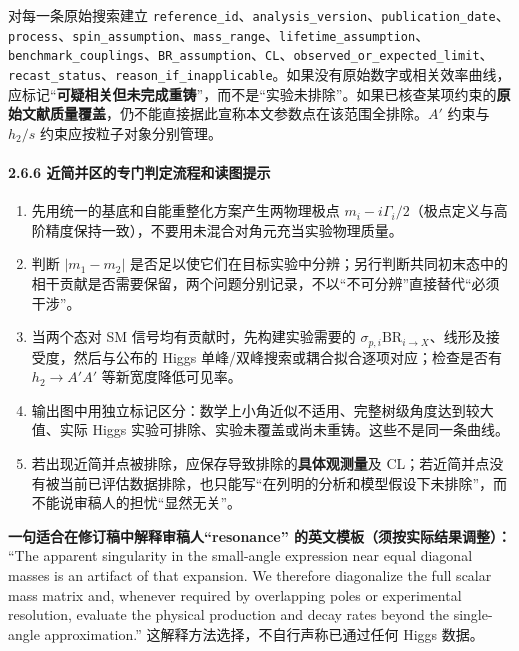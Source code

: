 \documentclass[
]{article}
\providecommand{\tightlist}{%
  \setlength{\itemsep}{0pt}\setlength{\parskip}{0pt}}
\begin{document}
对每一条原始搜索建立
\texttt{reference\_id}、\texttt{analysis\_version}、\texttt{publication\_date}、\texttt{process}、\texttt{spin\_assumption}、\texttt{mass\_range}、\texttt{lifetime\_assumption}、\texttt{benchmark\_couplings}、\texttt{BR\_assumption}、\texttt{CL}、\texttt{observed\_or\_expected\_limit}、\texttt{recast\_status}、\texttt{reason\_if\_inapplicable}。如果没有原始数字或相关效率曲线，应标记``\textbf{可疑相关但未完成重铸}''，而不是``实验未排除''。如果已核查某项约束的\textbf{原始文献质量覆盖}，仍不能直接据此宣称本文参数点在该范围全排除。\(A'\)
约束与 \(h_2/s\) 约束应按粒子对象分别管理。

\paragraph{2.6.6
近简并区的专门判定流程和读图提示}\label{ux8fd1ux7b80ux5e76ux533aux7684ux4e13ux95e8ux5224ux5b9aux6d41ux7a0bux548cux8bfbux56feux63d0ux793a}

\begin{enumerate}
\def\labelenumi{\arabic{enumi}.}
\tightlist
\item
  先用统一的基底和自能重整化方案产生两物理极点
  \(m_i-i\Gamma_i/2\)（极点定义与高阶精度保持一致），不要用未混合对角元充当实验物理质量。
\item
  判断 \(|m_1-m_2|\)
  是否足以使它们在目标实验中分辨；另行判断共同初末态中的相干贡献是否需要保留，两个问题分别记录，不以``不可分辨''直接替代``必须干涉''。
\item
  当两个态对 SM 信号均有贡献时，先构建实验需要的
  \(\sigma_{p,i}\mathrm{BR}_{i\to X}\)、线形及接受度，然后与公布的 Higgs
  单峰/双峰搜索或耦合拟合逐项对应；检查是否有 \(h_2\to A'A'\)
  等新宽度降低可见率。
\item
  输出图中用独立标记区分：数学上小角近似不适用、完整树级角度达到较大值、实际
  Higgs 实验可排除、实验未覆盖或尚未重铸。这些不是同一条曲线。
\item
  若出现近简并点被排除，应保存导致排除的\textbf{具体观测量}及
  CL；若近简并点没有被当前已评估数据排除，也只能写``在列明的分析和模型假设下未排除''，而不能说审稿人的担忧``显然无关''。
\end{enumerate}

\textbf{一句适合在修订稿中解释审稿人``resonance''
的英文模板（须按实际结果调整）：} ``The apparent singularity in the
small-angle expression near equal diagonal masses is an artifact of that
expansion. We therefore diagonalize the full scalar mass matrix and,
whenever required by overlapping poles or experimental resolution,
evaluate the physical production and decay rates beyond the single-angle
approximation.'' 这解释方法选择，不自行声称已通过任何 Higgs 数据。
\end{document}

